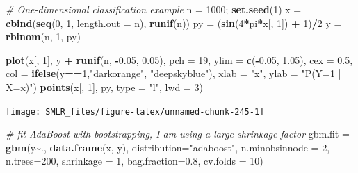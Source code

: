 \documentclass[
]{book}
\newenvironment{Shaded}{\begin{snugshade}}{\end{snugshade}}
\newcommand{\AttributeTok}[1]{\textcolor[rgb]{0.13,0.29,0.53}{#1}}
\newcommand{\CommentTok}[1]{\textcolor[rgb]{0.56,0.35,0.01}{\textit{#1}}}
\newcommand{\DecValTok}[1]{\textcolor[rgb]{0.00,0.00,0.81}{#1}}
\newcommand{\FloatTok}[1]{\textcolor[rgb]{0.00,0.00,0.81}{#1}}
\newcommand{\FunctionTok}[1]{\textcolor[rgb]{0.13,0.29,0.53}{\textbf{#1}}}
\newcommand{\NormalTok}[1]{#1}
\newcommand{\OtherTok}[1]{\textcolor[rgb]{0.56,0.35,0.01}{#1}}
\newcommand{\SpecialCharTok}[1]{\textcolor[rgb]{0.81,0.36,0.00}{\textbf{#1}}}
\newcommand{\StringTok}[1]{\textcolor[rgb]{0.31,0.60,0.02}{#1}}
\theoremstyle{definition}
\theoremstyle{definition}
\theoremstyle{definition}
\theoremstyle{definition}
\theoremstyle{remark}
\begin{document}
\begin{Shaded}
\begin{Highlighting}[]
  \CommentTok{\# One{-}dimensional classification example}
\NormalTok{  n }\OtherTok{=} \DecValTok{1000}\NormalTok{; }\FunctionTok{set.seed}\NormalTok{(}\DecValTok{1}\NormalTok{)}
\NormalTok{  x }\OtherTok{=} \FunctionTok{cbind}\NormalTok{(}\FunctionTok{seq}\NormalTok{(}\DecValTok{0}\NormalTok{, }\DecValTok{1}\NormalTok{, }\AttributeTok{length.out =}\NormalTok{ n), }\FunctionTok{runif}\NormalTok{(n))}
\NormalTok{  py }\OtherTok{=}\NormalTok{ (}\FunctionTok{sin}\NormalTok{(}\DecValTok{4}\SpecialCharTok{*}\NormalTok{pi}\SpecialCharTok{*}\NormalTok{x[, }\DecValTok{1}\NormalTok{]) }\SpecialCharTok{+} \DecValTok{1}\NormalTok{)}\SpecialCharTok{/}\DecValTok{2}
\NormalTok{  y }\OtherTok{=} \FunctionTok{rbinom}\NormalTok{(n, }\DecValTok{1}\NormalTok{, py)}
  
  \FunctionTok{plot}\NormalTok{(x[, }\DecValTok{1}\NormalTok{], y }\SpecialCharTok{+} \FunctionTok{runif}\NormalTok{(n, }\SpecialCharTok{{-}}\FloatTok{0.05}\NormalTok{, }\FloatTok{0.05}\NormalTok{), }\AttributeTok{pch =} \DecValTok{19}\NormalTok{, }\AttributeTok{ylim =} \FunctionTok{c}\NormalTok{(}\SpecialCharTok{{-}}\FloatTok{0.05}\NormalTok{, }\FloatTok{1.05}\NormalTok{), }\AttributeTok{cex =} \FloatTok{0.5}\NormalTok{,}
       \AttributeTok{col =} \FunctionTok{ifelse}\NormalTok{(y}\SpecialCharTok{==}\DecValTok{1}\NormalTok{,}\StringTok{"darkorange"}\NormalTok{, }\StringTok{"deepskyblue"}\NormalTok{), }\AttributeTok{xlab =} \StringTok{"x"}\NormalTok{, }\AttributeTok{ylab =} \StringTok{"P(Y=1 | X=x)"}\NormalTok{)}
  \FunctionTok{points}\NormalTok{(x[, }\DecValTok{1}\NormalTok{], py, }\AttributeTok{type =} \StringTok{"l"}\NormalTok{, }\AttributeTok{lwd =} \DecValTok{3}\NormalTok{)}
\end{Highlighting}
\end{Shaded}

\begin{center}\texttt{[image: SMLR\_files/figure-latex/unnamed-chunk-245-1]} \end{center}

\begin{Shaded}
\begin{Highlighting}[]
  
  \CommentTok{\# fit AdaBoost with bootstrapping, I am using a large shrinkage factor}
\NormalTok{  gbm.fit }\OtherTok{=} \FunctionTok{gbm}\NormalTok{(y}\SpecialCharTok{\textasciitilde{}}\NormalTok{., }\FunctionTok{data.frame}\NormalTok{(x, y), }\AttributeTok{distribution=}\StringTok{"adaboost"}\NormalTok{, }\AttributeTok{n.minobsinnode =} \DecValTok{2}\NormalTok{, }
                \AttributeTok{n.trees=}\DecValTok{200}\NormalTok{, }\AttributeTok{shrinkage =} \DecValTok{1}\NormalTok{, }\AttributeTok{bag.fraction=}\FloatTok{0.8}\NormalTok{, }\AttributeTok{cv.folds =} \DecValTok{10}\NormalTok{)}
\end{Highlighting}
\end{Shaded}
\end{document}
